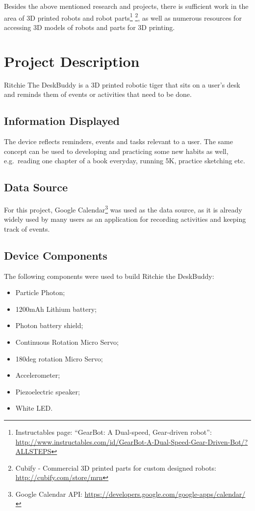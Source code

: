 \documentclass{sigchi-ext}
\begin{document}
Besides the above mentioned research and projects, there is sufficient work in
the area of 3D printed robots and robot parts\cite{megaro2015interactive,
schulz2015interactive}\footnote{Instructables page: ``GearBot: A Dual-speed,
Gear-driven robot'':
\url{http://www.instructables.com/id/GearBot-A-Dual-Speed-Gear-Driven-Bot/?ALLSTEPS}} \footnote{Cubify
- Commercial 3D printed parts for custom designed robots:
\url{http://cubify.com/store/mrn}}, as well as numerous resources for accessing 3D
models of robots and parts for 3D printing.

\section{Project Description}

Ritchie The DeskBuddy is a 3D printed robotic tiger that sits on a user's desk
and reminds them of events or activities that need to be done.

\subsection{Information Displayed}

The device reflects reminders, events and tasks relevant to a user. The same
concept can be used to developing and practicing some new habits as well, e.g.\
reading one chapter of a book everyday, running 5K, practice sketching etc.

\subsection{Data Source}

For this project, Google Calendar\footnote{Google Calendar API:
  \url{https://developers.google.com/google-apps/calendar/}} was used as the data
source, as it is already widely used by many users as an application for
recording activities and keeping track of events.

\subsection{Device Components}

The following components were used to build Ritchie the DeskBuddy:

\begin{itemize}
  \item Particle Photon;
  \item 1200mAh Lithium battery;
  \item Photon battery shield;
  \item Continuous Rotation Micro Servo;
  \item 180deg rotation Micro Servo;
  \item Accelerometer;
  \item Piezoelectric speaker;
  \item White LED.
\end{itemize}
\end{document}
